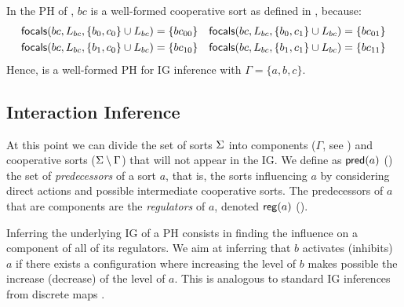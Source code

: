 \begin{example*}
In the PH of , $bc$ is a well-formed cooperative sort as defined in , because:
\begin{align*}
\mathsf{focals}(bc, L_{bc}, \{b_0, c_0\} \cup L_{bc}) = \{bc_{00}\} && \mathsf{focals}(bc, L_{bc}, \{b_0, c_1\} \cup L_{bc}) = \{bc_{01}\} \\
\mathsf{focals}(bc, L_{bc}, \{b_1, c_0\} \cup L_{bc}) = \{bc_{10}\} && \mathsf{focals}(bc, L_{bc}, \{b_1, c_1\} \cup L_{bc}) = \{bc_{11}\}
\end{align*}
Hence,  is a well-formed PH for IG inference with $\Gamma = \{a,b,c\}$.
\end{example*}



\subsection{Interaction Inference}\label{ssec:infer-IG}

At this point we can divide the set of sorts $\Sigma$ into components ($\Gamma$, see ) and cooperative sorts
($\Sigma \setminus \Gamma$) that will not appear in the IG. 
We define as $\mathsf{pred}(a)$ () the set of \emph{predecessors} of a sort $a$, that is, the sorts influencing $a$
by considering direct actions and possible intermediate cooperative sorts.
The predecessors of $a$ that are components are the \emph{regulators} of $a$, denoted $\mathsf{reg}({a})$
().

Inferring the underlying IG of a PH consists in finding the influence on a component of all of its regulators.
We aim at inferring that $b$ activates (inhibits) $a$ if there exists a configuration where increasing the level of $b$ makes possible the increase (decrease) of the level of $a$.
This is analogous to standard IG inferences from discrete maps \cite{RiCo07}.

\begin{comment}
Given a set $g$ of components and a configuration (\ie a sub-state) $\sigma$, $\ctx_g(\sigma)$
refers to the set of processes hitting $a$ regulated by any sort in $g$ (\pref{eq:ctx-sigma}).
If $g=\{b\}$, we simple note $\ctx_b(\sigma)$.
This set is composed of the active processes of sorts in $g$, and the focal process (assumed
unique) of the cooperative sorts $\upsilon$ hitting $a$ that have a predecessor in $g$.
The evaluation of the focal process of $\upsilon$ in context $\sigma$, denoted $\upsilon(\sigma)$,
relies on \pref{pro:wf-cooperative-sort}, which gives its value when all the direct predecessors of
$\upsilon$ are defined in $\sigma$.
When a predecessor $\upsilon'$ is not in $\sigma$, we extend the evaluation by recursively computing
the focal value of $\upsilon'$ is $\sigma$, as stated in \pref{eq:cooperative-eval}.
Because there is no cycle between cooperative sorts, this recursive evaluation of $\upsilon(\sigma)$
always terminates.
\end{comment}

